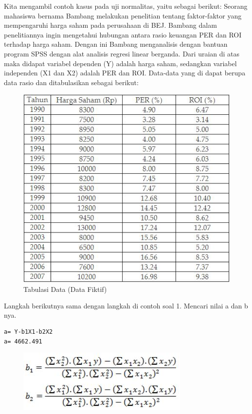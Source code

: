 \par Kita mengambil contoh kasus pada uji normalitas, yaitu sebagai berikut: Seorang mahasiswa bernama Bambang melakukan penelitian tentang faktor-faktor yang mempengaruhi harga saham pada perusahaan di BEJ.\citep{priyatno2014spss} Bambang dalam penelitiannya ingin mengetahui hubungan antara rasio keuangan PER dan ROI terhadap harga saham. Dengan ini Bambang menganalisis dengan bantuan program SPSS dengan alat analisis regresi linear berganda. Dari uraian di atas maka didapat variabel dependen (Y) adalah harga saham, sedangkan variabel independen (X1 dan X2) adalah PER dan ROI.
Data-data yang di dapat berupa data rasio dan ditabulasikan sebagai berikut: \begin{figure}[!htbp]
    \centering
    \includegraphics[scale=0.7]{chapters/figures/cs.JPG}
    \caption{Tabulasi Data (Data Fiktif)}
\end{figure}
\newpage \par Langkah berikutnya sama dengan langkah di contoh soal 1. Mencari nilai a dan b nya. \begin{lstlisting}
a= Y-b1X1-b2X2      
a= 4662.491
\end{lstlisting}
\begin{figure}[!htbp]
\includegraphics[scale=0.6]{chapters/figures/b1b2.JPG}
    \label{Figure4}
\end{figure}
